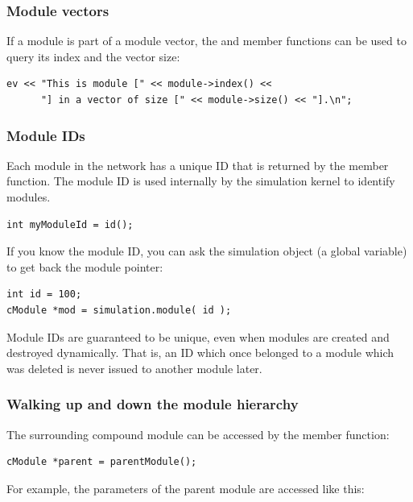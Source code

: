 \subsubsection{Module vectors}


If a module is part of a module vector, the
 and  member functions can be used to
query its index and the vector size:

\begin{verbatim}
ev << "This is module [" << module->index() <<
      "] in a vector of size [" << module->size() << "].\n";
\end{verbatim}


\subsubsection{Module IDs}


Each module in the network has a unique ID that is returned by the
 member function. The module ID is used
internally by the simulation kernel to identify modules.

\begin{verbatim}
int myModuleId = id();
\end{verbatim}

If you know the module ID, you can ask the simulation object
(a global variable) to get back the module pointer:

\begin{verbatim}
int id = 100;
cModule *mod = simulation.module( id );
\end{verbatim}


Module IDs are guaranteed to be unique, even when modules are
created and destroyed dynamically. That is, an ID which once
belonged to a module which was deleted is never issued to another
module later.


\subsubsection{Walking up and down the module hierarchy}


The surrounding compound module can be accessed by the
 member function:

\begin{verbatim}
cModule *parent = parentModule();
\end{verbatim}

For example, the parameters of the parent module are accessed
like this:

